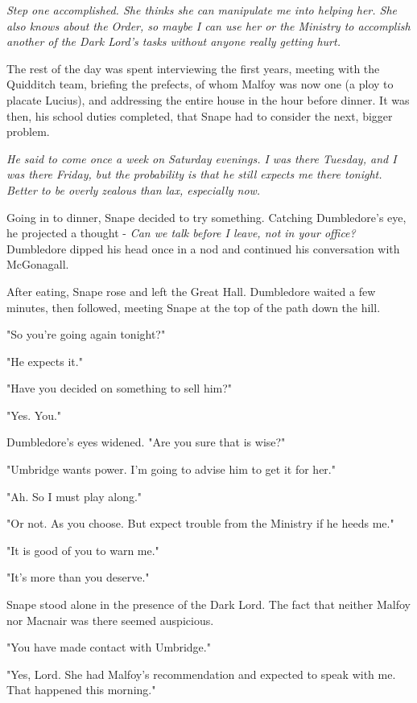 \emph{Step one accomplished. She thinks she can manipulate me into helping her. She also knows about the Order, so maybe I can use her or the Ministry to accomplish another of the Dark Lord's tasks without anyone really getting hurt.}

The rest of the day was spent interviewing the first years, meeting with the Quidditch team, briefing the prefects, of whom Malfoy was now one (a ploy to placate Lucius), and addressing the entire house in the hour before dinner. It was then, his school duties completed, that Snape had to consider the next, bigger problem.

\emph{He said to come once a week on Saturday evenings. I was there Tuesday, and I was there Friday, but the probability is that he still expects me there tonight. Better to be overly zealous than lax, especially now.}

Going in to dinner, Snape decided to try something. Catching Dumbledore's eye, he projected a thought - \emph{Can we talk before I leave, not in your office?} Dumbledore dipped his head once in a nod and continued his conversation with McGonagall.

After eating, Snape rose and left the Great Hall. Dumbledore waited a few minutes, then followed, meeting Snape at the top of the path down the hill.

"So you're going again tonight?"

"He expects it."

"Have you decided on something to sell him?"

"Yes. You."

Dumbledore's eyes widened. "Are you sure that is wise?"

"Umbridge wants power. I'm going to advise him to get it for her."

"Ah. So I must play along."

"Or not. As you choose. But expect trouble from the Ministry if he heeds me."

"It is good of you to warn me."

"It's more than you deserve."

\sbreak

Snape stood alone in the presence of the Dark Lord. The fact that neither Malfoy nor Macnair was there seemed auspicious.

"You have made contact with Umbridge."

"Yes, Lord. She had Malfoy's recommendation and expected to speak with me. That happened this morning."

